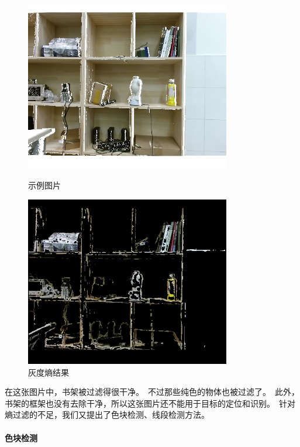 \begin{figure}[H]
\begin{minipage}[t]{0.5\textwidth}
	\centering
    \includegraphics[width = 0.8\textwidth]{images/registered.png}
    \caption{示例图片}
    \label{fig:registered}
\end{minipage}
\begin{minipage}[t]{0.5\textwidth}
	\centering
    \includegraphics[width = 0.8\textwidth]{images/entropy_block.png}
    \caption{灰度熵结果}
    \label{fig:entropy_block}
\end{minipage}
\end{figure}

在这张图片中，书架被过滤得很干净。\ 不过那些纯色的物体也被过滤了。\ 此外，书架的框架也没有去除干净，所以这张图片还不能用于目标的定位和识别。\ 针对熵过滤的不足，我们又提出了色块检测、线段检测方法。\     
    
\paragraph{色块检测}

